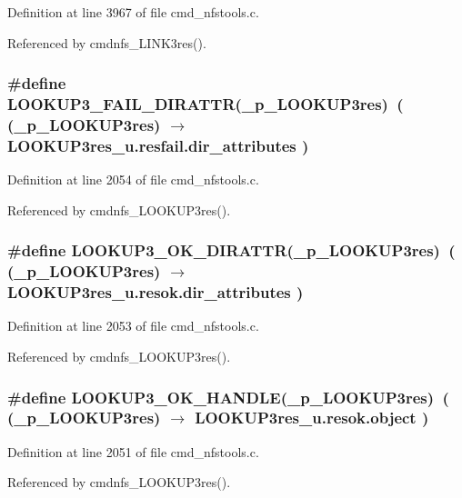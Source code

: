 Definition at line 3967 of file cmd\_\-nfstools.c.

Referenced by cmdnfs\_\-LINK3res().
\subsubsection{\setlength{\rightskip}{0pt plus 5cm}\#define LOOKUP3\_\-FAIL\_\-DIRATTR(\_\-p\_\-LOOKUP3res)\ ( (\_\-p\_\-LOOKUP3res) $\rightarrow$ LOOKUP3res\_\-u.resfail.dir\_\-attributes )}\label{cmd__nfstools_8c_a12}




Definition at line 2054 of file cmd\_\-nfstools.c.

Referenced by cmdnfs\_\-LOOKUP3res().
\subsubsection{\setlength{\rightskip}{0pt plus 5cm}\#define LOOKUP3\_\-OK\_\-DIRATTR(\_\-p\_\-LOOKUP3res)\ ( (\_\-p\_\-LOOKUP3res) $\rightarrow$ LOOKUP3res\_\-u.resok.dir\_\-attributes )}\label{cmd__nfstools_8c_a11}




Definition at line 2053 of file cmd\_\-nfstools.c.

Referenced by cmdnfs\_\-LOOKUP3res().
\subsubsection{\setlength{\rightskip}{0pt plus 5cm}\#define LOOKUP3\_\-OK\_\-HANDLE(\_\-p\_\-LOOKUP3res)\ ( (\_\-p\_\-LOOKUP3res) $\rightarrow$ LOOKUP3res\_\-u.resok.object )}\label{cmd__nfstools_8c_a9}




Definition at line 2051 of file cmd\_\-nfstools.c.

Referenced by cmdnfs\_\-LOOKUP3res().
